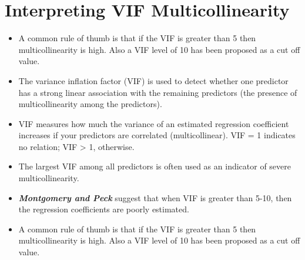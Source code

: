 \documentclass[a4paper,12pt]{article}
\begin{document}

\section{Interpreting VIF Multicollinearity}

\begin{itemize}

\item A common rule of thumb is that if the VIF is greater than 5 then multicollinearity is high. Also a VIF level of 10 has been proposed as a cut off value.

\item  The variance inflation factor (VIF) is used to detect whether one predictor has a strong linear association
with the remaining predictors (the presence of multicollinearity among the predictors).

\item  VIF measures how much the variance of an estimated regression coefficient increases if your predictors
are correlated (multicollinear). VIF = 1 indicates no relation; VIF > 1, otherwise.

\item  The largest VIF among all predictors is often used as an indicator of severe multicollinearity.
\item  \textbf{\textit{Montgomery and Peck}} suggest that when VIF is greater than 5-10, then the regression coefficients are poorly estimated.
\item A common rule of thumb is that if the VIF is greater than 5 then multicollinearity is high.
Also a VIF level of 10 has been proposed as a cut off value.

\end{itemize}


%
%
%	
%	
\end{document}
